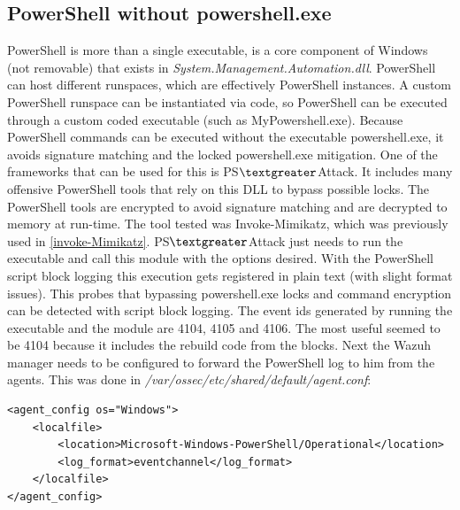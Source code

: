 \subsection{PowerShell without powershell.exe}
PowerShell is more than a single executable, is a core component of Windows (not removable) that exists in \textit{System.Management.Automation.dll}.
PowerShell can host different runspaces, which are effectively PowerShell instances.
A custom PowerShell runspace can be instantiated via code, so PowerShell can be executed through a custom coded executable (such as MyPowershell.exe).
\linej
Because PowerShell commands can be executed without the executable powershell.exe, it avoids signature matching and the locked powershell.exe mitigation\cite{powershell_adsecurity}.
\linej
\linej
One of the frameworks that can be used for this is PS$\textgreater$Attack\cite{PSAttack}.
It includes many offensive PowerShell tools that rely on this DLL to bypass possible locks.
The PowerShell tools are encrypted to avoid signature matching and are decrypted to memory at run-time\cite{powershell_adsecurity}.
\linej
The tool tested was Invoke-Mimikatz, which was previously used in \ref{invoke-Mimikatz}.
PS$\textgreater$Attack just needs to run the executable and call this module with the options desired.
\linej
\linej
With the PowerShell script block logging this execution gets registered in plain text (with slight format issues).
This probes that bypassing powershell.exe locks and command encryption can be detected with script block logging.
The event ids generated by running the executable and the module are 4104, 4105 and 4106. The most useful seemed to be 4104 because it includes the rebuild code from the blocks.
\linej
\linej
Next the Wazuh manager needs to be configured to forward the PowerShell log to him from the agents. This was done in \textit{/var/ossec/etc/shared/default/agent.conf}:
\begin{lstlisting}[style=xml]
<agent_config os="Windows">
	<localfile>
		<location>Microsoft-Windows-PowerShell/Operational</location>
		<log_format>eventchannel</log_format>
	</localfile>
</agent_config>
\end{lstlisting}

